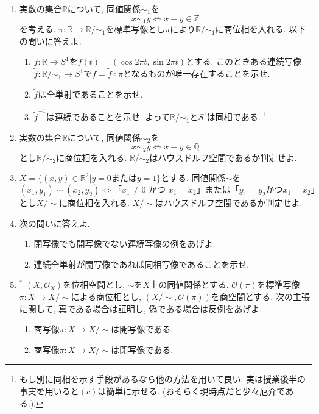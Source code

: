 \documentclass[dvipdfmx,a4paper,11pt]{article}
\newcommand{\R}{\mathbb{R}}
\newcommand{\Z}{\mathbb{Z}}
\newcommand{\Q}{\mathbb{Q}}
\theoremstyle{definition}
\begin{document}
\begin{enumerate}[ label=\textbf{問}6.\arabic*]
	
	

\item 実数の集合$\R$について, 同値関係$\sim_{1}$を
	$$
	x \sim_{1} y \Leftrightarrow x - y \in \Z
	$$
	を考える. $\pi : \R \rightarrow \R / \sim_{1}$を標準写像とし$\pi$により$\R / \sim_{1}$に商位相を入れる. 以下の問いに答えよ.
	\begin{enumerate}
	\item $f : \R \rightarrow S^1$を$f(t) = (\cos 2 \pi t, \sin 2 \pi t)$とする. このときある連続写像$\tilde{f}: \R / \sim_{1} \rightarrow S^1$で$f = \tilde{f} \circ \pi $となるものが唯一存在することを示せ. 
	\item $\tilde{f}$は全単射であることを示せ. 
	\item $\tilde{f}^{-1}$は連続であることを示せ. よって$\R / \sim_{1}$と$S^1$は同相である. \footnote{もし別に同相を示す手段があるなら他の方法を用いて良い. 実は授業後半の事実を用いると$(c)$は簡単に示せる. (おそらく現時点だと少々厄介である.).}
	\end{enumerate}

	

\item 実数の集合$\R$について, 同値関係$\sim_{2}$を
	$$
	x \sim_{2} y \Leftrightarrow x - y \in \Q
	$$
	とし$\R / \sim_{2}$に商位相を入れる.  $\R / \sim_{2}$はハウスドルフ空間であるか判定せよ. 

\item $X = \{(x,y) \in \R^2| \text{$y=0$または$y=1$} \}$とする. 同値関係$\sim$を
	$$
	(x_1,y_1) \sim (x_2,y_2) \Leftrightarrow \text{「$x_1 \neq 0$ かつ $x_1=x_2$」または「$y_1=y_2$かつ$x_1=x_2$」}
	$$
	とし$X / \sim$に商位相を入れる.  $X/ \sim$はハウスドルフ空間であるか判定せよ. 


 
\item 次の問いに答えよ. 
	\begin{enumerate}
	\item 閉写像でも開写像でない連続写像の例をあげよ.
	\item 連続全単射が開写像であれば同相写像であることを示せ.
	\end{enumerate}
	
\item$^*$ $(X, \mathscr{O}_X )$を位相空間とし, $\sim$を$X$上の同値関係とする. $\mathscr{O}(\pi)$を標準写像$\pi : X \rightarrow X/\sim$による商位相とし, $(X/\sim, \mathscr{O}(\pi))$を商空間とする. 
次の主張に関して, 真である場合は証明し, 偽である場合は反例をあげよ.
	\begin{enumerate}
	\item 商写像$\pi : X \rightarrow X/\sim$は開写像である.
	\item 商写像$\pi : X \rightarrow X/\sim$は閉写像である.
	\end{enumerate}
	

\end{enumerate}
\end{document}

